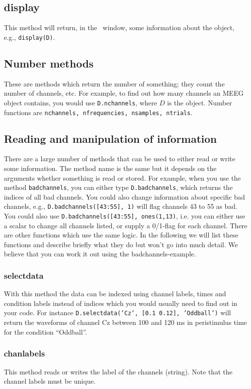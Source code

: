 \subsection{display}
This method will return, in the \matlab\ window, some information about the object, e.g., \texttt{display(D)}.

\subsection{Number methods}
These are methods which return the number of something; they count the number of channels, etc. For example, to find out how many channels an MEEG object contains, you would use \texttt{D.nchannels}, where $D$ is the object. Number functions are \texttt{nchannels, nfrequencies, nsamples, ntrials}.

\subsection{Reading and manipulation of information}
There are a large number of methods that can be used to either read or write some information. The method name is the same but it depends on the arguments whether something is read or stored. For example, when you use the method \texttt{badchannels}, you can either type \texttt{D.badchannels}, which returns the indices of all bad channels. You could also change information about specific bad channels, e.g., \texttt{D.badchannels([43:55], 1)} will flag channels 43 to 55 as bad. You   could also use \texttt{D.badchannels([43:55], ones(1,13)}, i.e. you can either use a scalar to change all channels listed, or supply a 0/1-flag for each channel. There are other functions which use the same logic. In the following we will list these functions and describe briefly what they do but won't go into much detail. We believe that you can work it out using the badchannels-example.

\subsubsection{selectdata}
With this method the data can be indexed using channel labels, times and condition labels instead of indices which you would usually need to find out in your code. For instance \texttt{D.selectdata('Cz', [0.1 0.12], 'Oddball')} will return the waveforms of channel Cz between 100 and 120 ms in peristimulus time for the condition ``Oddball''.

\subsubsection{chanlabels}
This method reads or writes the label of the channels (string).  Note that the channel labels must be unique.

